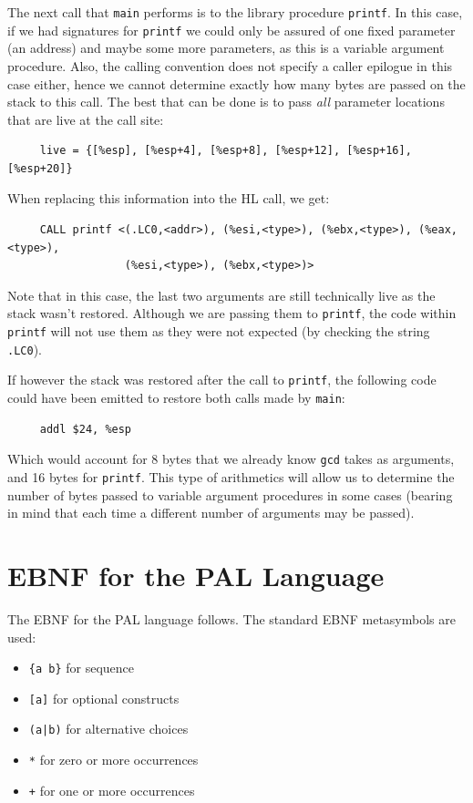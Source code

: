 The next call that \texttt{main} performs is to the library procedure 
\texttt{printf}.  In this case, if we had signatures for \texttt{printf} 
we could only be assured of one fixed parameter (an address) and maybe
some more parameters, as this is a variable argument procedure.  
Also, the calling convention does not specify a caller epilogue in 
this case either, hence we cannot determine exactly how many bytes
are passed on the stack to this call.  The best that can be done is
to pass \emph{all} parameter locations that are live at the call site: 
\begin{verbatim}
     live = {[%esp], [%esp+4], [%esp+8], [%esp+12], [%esp+16], [%esp+20]}
\end{verbatim} 
When replacing this information into the HL call, we get: 
\begin{verbatim}
     CALL printf <(.LC0,<addr>), (%esi,<type>), (%ebx,<type>), (%eax,<type>),
                  (%esi,<type>), (%ebx,<type>)>
\end{verbatim}
Note that in this case, the last two arguments are still technically
live as the stack wasn't restored.  Although we are passing them to 
\texttt{printf}, the code within \texttt{printf} will not use them 
as they were not expected (by checking the string \texttt{.LC0}). 

If however the stack was restored after the call to \texttt{printf}, 
the following code could have been emitted to restore both calls made
by \texttt{main}: 
\begin{verbatim}
     addl $24, %esp
\end{verbatim}
Which would account for 8 bytes that we already know \texttt{gcd} takes
as arguments, and 16 bytes for \texttt{printf}.  This type of arithmetics
will allow us to determine the number of bytes passed to variable 
argument procedures in some cases (bearing in mind that each time 
a different number of arguments may be passed). 


\section{EBNF for the PAL Language}

The EBNF for the PAL language follows.  The standard EBNF
metasymbols are used:

\begin{itemize}
\item \verb!{a b}! for sequence
\item \texttt{[a]} for optional constructs
\item \texttt{(a|b)} for alternative choices
\item \texttt{*} for zero or more occurrences
\item \texttt{+} for one or more occurrences
\end{itemize}

